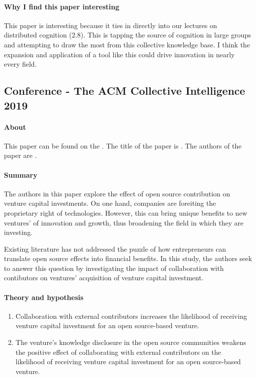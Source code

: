 \paragraph{Why I find this paper interesting}
This paper is interesting because it ties in directly into our lectures on distributed cognition (2.8). This is tapping the source of cognition in large groups and attempting to draw the most from this collective knowledge base. I think the expansion and application of a tool like this could drive innovation in nearly every field.

\subsection{Conference - The ACM Collective Intelligence 2019}

\paragraph{About}
This paper can be found on the . The title of the paper is . The authors of the paper are .

\paragraph{Summary}
The authors in this paper explore the effect of open source contribution on venture capital investments. On one hand, companies are foreiting the proprietary right of technologies. However, this can bring unique benefits to new ventures' of innovation and growth, thus broadening the field in which they are investing.

Existing literature has not addressed the puzzle of how entrepreneurs can translate open source effects into financial benefits. In this study, the authors seek to answer this question by investigating the impact of collaboration with contibutors on ventures' acquisition of venture capital investment.

\paragraph{Theory and hypothesis}

\begin{enumerate}
\item
  Collaboration with external contributors increases the likelihood of receiving venture capital investment for an open source-based venture.
\item
   The venture’s knowledge disclosure in the open source communities weakens the positive effect of collaborating with external contributors on the likelihood of receiving venture capital investment for an open source-based venture.
\end{enumerate}


